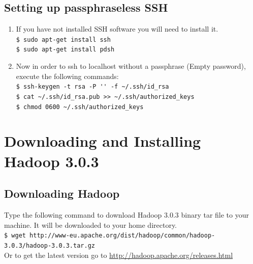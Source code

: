 \documentclass[12pt]{article}%
\begin{document}
\subsection{Setting up passphraseless SSH}
\begin{enumerate}
\item If you have not installed SSH software you will need to install it.\\
\lstinline{$ sudo apt-get install ssh}\\
\lstinline{$ sudo apt-get install pdsh}\\
\item Now in order to  ssh to localhost without a passphrase (Empty password), execute the following commands:\\
\lstinline{$ ssh-keygen -t rsa -P '' -f ~/.ssh/id_rsa}\\
\lstinline{$ cat ~/.ssh/id_rsa.pub >> ~/.ssh/authorized_keys}\\
\lstinline{$ chmod 0600 ~/.ssh/authorized_keys}
\end{enumerate}

\section{Downloading and Installing Hadoop 3.0.3}
\subsection{Downloading Hadoop}
Type the following command to download Hadoop 3.0.3 binary tar file to your machine. It will be downloaded to your home directory.\\
\lstinline{$ wget http://www-eu.apache.org/dist/hadoop/common/hadoop-3.0.3/hadoop-3.0.3.tar.gz}\\
Or to get the latest version go to \url{http://hadoop.apache.org/releases.html}
\end{document}
